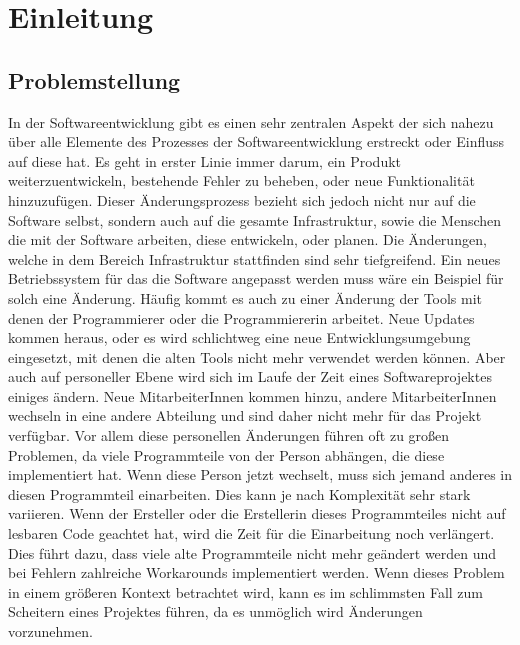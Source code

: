 \chapter{Einleitung}
\label{cha:Einleitung}

\section{Problemstellung}
\SuperPar In der Softwareentwicklung gibt es einen sehr zentralen Aspekt der sich nahezu über alle Elemente des Prozesses der Softwareentwicklung erstreckt oder Einfluss auf diese hat. Es geht in erster Linie immer darum, ein Produkt weiterzuentwickeln, bestehende Fehler zu beheben, oder neue Funktionalität hinzuzufügen. Dieser Änderungsprozess bezieht sich jedoch nicht nur auf die Software selbst, sondern auch auf die gesamte Infrastruktur, sowie die Menschen die mit der Software arbeiten, diese entwickeln, oder planen. Die Änderungen, welche in dem Bereich Infrastruktur stattfinden sind sehr tiefgreifend. Ein neues Betriebssystem für das die Software angepasst werden muss wäre ein Beispiel für solch eine Änderung. Häufig kommt es auch zu einer Änderung der Tools mit denen der Programmierer oder die Programmiererin arbeitet. Neue Updates kommen heraus, oder es wird schlichtweg eine neue Entwicklungsumgebung eingesetzt, mit denen die alten Tools nicht mehr verwendet werden können. Aber auch auf personeller Ebene wird sich im Laufe der Zeit eines Softwareprojektes einiges ändern. Neue MitarbeiterInnen kommen hinzu, andere MitarbeiterInnen wechseln in eine andere Abteilung und sind daher nicht mehr für das Projekt verfügbar. Vor allem diese personellen Änderungen führen oft zu großen Problemen, da viele Programmteile von der Person abhängen, die diese implementiert hat. Wenn diese Person jetzt wechselt, muss sich jemand anderes in diesen Programmteil einarbeiten. Dies kann je nach Komplexität sehr stark variieren. Wenn der Ersteller oder die Erstellerin dieses Programmteiles nicht auf lesbaren Code geachtet hat, wird die Zeit für die Einarbeitung noch verlängert. Dies führt dazu, dass viele alte Programmteile nicht mehr geändert werden und bei Fehlern zahlreiche Workarounds implementiert werden. Wenn dieses Problem in einem größeren Kontext betrachtet wird, kann es im schlimmsten Fall zum Scheitern eines Projektes führen, da es unmöglich wird Änderungen vorzunehmen. 

